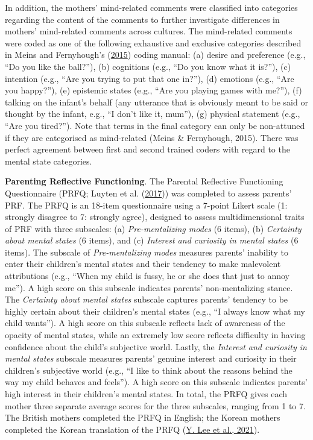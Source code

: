 \documentclass[
]{article}
\begin{document}
In addition, the mothers' mind-related comments were classified into categories regarding the content of the comments to further investigate differences in mothers' mind-related comments across cultures. The mind-related comments were coded as one of the following exhaustive and exclusive categories described in Meins and Fernyhough's (\protect\hyperlink{ref-Meins2015}{2015}) coding manual: (a) desire and preference (e.g., ``Do you like the ball?''), (b) cognitions (e.g., ``Do you know what it is?''), (c) intention (e.g., ``Are you trying to put that one in?''), (d) emotions (e.g., ``Are you happy?''), (e) epistemic states (e.g., ``Are you playing games with me?''), (f) talking on the infant's behalf (any utterance that is obviously meant to be said or thought by the infant, e.g., ``I don't like it, mum''), (g) physical statement (e.g., ``Are you tired?''). Note that terms in the final category can only be non-attuned if they are categorised as mind-related (Meins \& Fernyhough, 2015). There was perfect agreement between first and second trained coders with regard to the mental state categories.

\textbf{Parenting Reflective Functioning}. The Parental Reflective Functioning Questionnaire (PRFQ; Luyten et al. (\protect\hyperlink{ref-Luyten2017}{2017})) was completed to assess parents' PRF. The PRFQ is an 18-item questionnaire using a 7-point Likert scale (1: strongly disagree to 7: strongly agree), designed to assess multidimensional traits of PRF with three subscales: (a) \emph{Pre-mentalizing modes} (6 items), (b) \emph{Certainty about mental states} (6 items), and (c) \emph{Interest and curiosity in mental states} (6 items). The subscale of \emph{Pre-mentalizing modes} measures parents' inability to enter their children's mental states and their tendency to make malevolent attributions (e.g., ``When my child is fussy, he or she does that just to annoy me''). A high score on this subscale indicates parents' non-mentalizing stance. The \emph{Certainty about mental states} subscale captures parents' tendency to be highly certain about their children's mental states (e.g., ``I always know what my child wants''). A high score on this subscale reflects lack of awareness of the opacity of mental states, while an extremely low score reflects difficulty in having confidence about the child's subjective world. Lastly, the \emph{Interest and curiosity in mental states} subscale measures parents' genuine interest and curiosity in their children's subjective world (e.g., ``I like to think about the reasons behind the way my child behaves and feels''). A high score on this subscale indicates parents' high interest in their children's mental states. In total, the PRFQ gives each mother three separate average scores for the three subscales, ranging from 1 to 7. The British mothers completed the PRFQ in English; the Korean mothers completed the Korean translation of the PRFQ (\protect\hyperlink{ref-Lee2021}{Y. Lee et al., 2021}).
\end{document}
